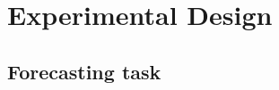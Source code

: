 

\section{Experimental Design}
\label{sec:model-setup}

\subsection{Forecasting task}
\label{sec:exp:task}



